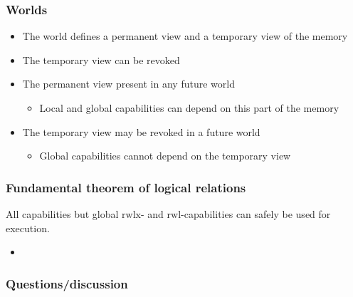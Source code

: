 \documentclass[handout]{beamer}
\newcommand{\plainperm}[1]{\mathrm{#1}}
\newcommand{\readwritel}{\plainperm{rwl}}
\newcommand{\rwl}{\readwritel}
\newcommand{\rwlx}{\plainperm{rwlx}}
\begin{document}
\begin{frame}
  \frametitle{Worlds}
  \begin{itemize}
  \item The world defines a permanent view and a temporary view of the memory
  \item The temporary view can be revoked
  \item The permanent view present in any future world
    \begin{itemize}
    \item Local and global capabilities can depend on this part of the memory
    \end{itemize}
  \item The temporary view may be revoked in a future world 
    \begin{itemize}
    \item Global capabilities cannot depend on the temporary view
    \end{itemize}
  \end{itemize}
\end{frame}

\begin{frame}
  \frametitle{Fundamental theorem of logical relations}
  \begin{theorem}
    All capabilities but global $\rwlx$- and $\rwl$-capabilities can safely be used for execution.
  \end{theorem}
  \begin{itemize}
  \item 
  \end{itemize}
\end{frame}

\begin{frame}
  \frametitle{Questions/discussion}
\end{frame}



% 
\end{document}
